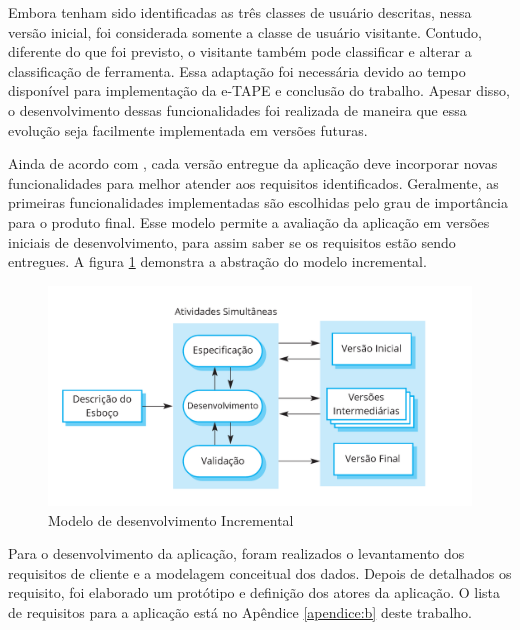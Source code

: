 \par
Embora tenham sido identificadas as três classes de usuário descritas, nessa versão inicial, foi considerada somente a classe de usuário visitante.
Contudo, diferente do que foi previsto, o visitante também pode classificar e alterar a classificação de ferramenta. Essa adaptação foi necessária devido ao tempo disponível 
para implementação da e-TAPE e conclusão do trabalho. Apesar disso, o desenvolvimento dessas funcionalidades foi realizada de maneira que essa evolução seja facilmente 
implementada em versões futuras.

\par
Ainda de acordo com , cada versão entregue da aplicação deve incorporar novas funcionalidades para melhor atender aos requisitos identificados. Geralmente, as primeiras funcionalidades implementadas são escolhidas pelo grau de importância para o produto final. Esse modelo permite a avaliação da aplicação em versões iniciais de desenvolvimento, para assim saber 
se os requisitos estão sendo entregues. A figura \ref{fig:modelo-incremental} demonstra a abstração do modelo incremental.

\begin{figure}[!ht]
    \centering
    \includegraphics[scale=0.20]{./figuras/modelo_incremental.png}
    \caption{Modelo de desenvolvimento Incremental }
    \label{fig:modelo-incremental}
\end{figure}

\par
Para o desenvolvimento da aplicação, foram realizados o levantamento dos requisitos de cliente e a modelagem conceitual dos dados.
Depois de detalhados os requisito, foi elaborado um protótipo e definição dos atores da aplicação. O lista de requisitos para a aplicação está no Apêndice \ref{apendice:b} deste trabalho. 

